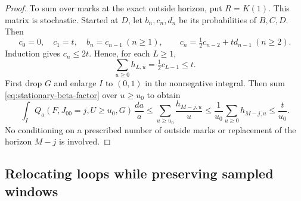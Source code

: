 \begin{proof}
To sum over marks at the exact outside horizon, put $R=K(1)$.
This matrix is stochastic. Started at $D$, let $b_n,c_n,d_n$ be its
probabilities of $B,C,D$. Then
\[
 c_0=0,\quad c_1=t,\quad b_n=c_{n-1}\ (n\ge1),\qquad
 c_n=\tfrac12 c_{n-2}+td_{n-1}\ (n\ge2).
\]
Induction gives $c_n\le2t$. Hence, for each $L\ge1$,
\[
 \sum_{u\ge0}h_{L,u}=\tfrac12 c_{L-1}\le t.
\]
First drop $G$ and enlarge $I$ to $(0,1)$ in the nonnegative integral.
Then sum \eqref{eq:stationary-beta-factor} over $u\ge u_0$ to obtain
\[
 \int_I Q_a(F,J_{00}=j,U\ge u_0,G)\,\frac{da}{a}
 \le\sum_{u\ge u_0}\frac{h_{M-j,u}}u
 \le\frac1{u_0}\sum_{u\ge0}h_{M-j,u}\le\frac t{u_0}.
\]
No conditioning on a prescribed number of outside marks or replacement
of the horizon $M-j$ is involved.
\end{proof}

\subsection{Relocating loops while preserving sampled windows}

